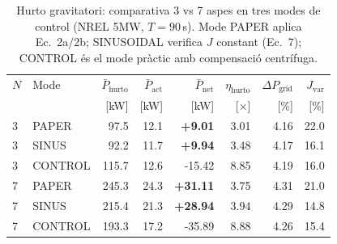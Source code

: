 \begin{table}[htbp]
\centering
\caption{Hurto gravitatori: comparativa 3 vs 7 aspes en tres modes de control (NREL 5MW, $T=90$\,s). Mode PAPER aplica Ec.~2a/2b; SINUSOIDAL verifica $J$ constant (Ec.~7); CONTROL és el mode pràctic amb compensació centrífuga.}
\label{tab:hurto_3vs7}
\begin{tabular}{llrrrrrr}
\toprule
$N$ & Mode & $\bar{P}_{\text{hurto}}$ & $\bar{P}_{\text{act}}$ & $\bar{P}_{\text{net}}$ & $\eta_{\text{hurto}}$ & $\Delta P_{\text{grid}}$ & $J_{\text{var}}$ \\
 & & [kW] & [kW] & [kW] & [$\times$] & [\%] & [\%] \\
\midrule
3 & PAPER & 97.5 & 12.1 & \textbf{+9.01} & 3.01 & 4.16 & 22.0 \\
3 & SINUS & 92.2 & 11.7 & \textbf{+9.94} & 3.48 & 4.17 & 16.1 \\
3 & CONTROL & 115.7 & 12.6 & -15.42 & 8.85 & 4.19 & 16.0 \\
\midrule
7 & PAPER & 245.3 & 24.3 & \textbf{+31.11} & 3.75 & 4.31 & 21.0 \\
7 & SINUS & 215.4 & 21.3 & \textbf{+28.94} & 3.94 & 4.29 & 14.8 \\
7 & CONTROL & 193.3 & 17.2 & -35.89 & 8.88 & 4.26 & 15.4 \\
\bottomrule
\end{tabular}
\end{table}
